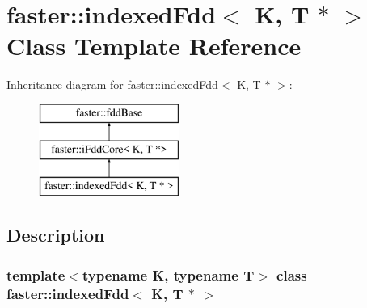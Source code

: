 \hypertarget{classfaster_1_1indexedFdd_3_01K_00_01T_01_5_01_4}{}\section{faster\+:\+:indexed\+Fdd$<$ K, T $\ast$ $>$ Class Template Reference}
\label{classfaster_1_1indexedFdd_3_01K_00_01T_01_5_01_4}
Inheritance diagram for faster\+:\+:indexed\+Fdd$<$ K, T $\ast$ $>$\+:\begin{figure}[H]
\begin{center}
\leavevmode
\includegraphics[height=3.000000cm]{classfaster_1_1indexedFdd_3_01K_00_01T_01_5_01_4}
\end{center}
\end{figure}


\subsection{Description}
\subsubsection*{template$<$typename K, typename T$>$\newline
class faster\+::indexed\+Fdd$<$ K, T $\ast$ $>$}


